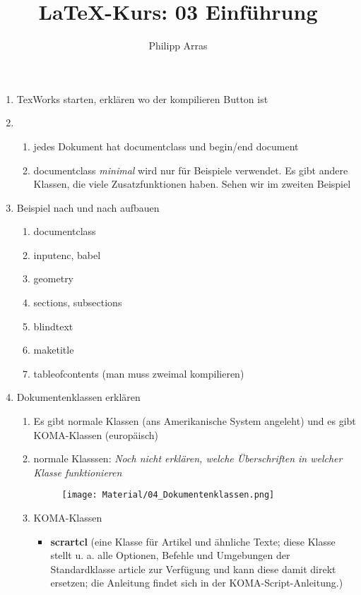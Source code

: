 \documentclass[11pt,a4paper]{article}
\author{Philipp Arras}
\title{\LaTeX -Kurs: 03 Einführung}
\begin{document}
\maketitle

\begin{enumerate}
\item TexWorks starten, erklären wo der kompilieren Button ist
\item 
	\begin{enumerate}
	\item jedes Dokument hat documentclass und begin/end document
	\item documentclass \emph{minimal} wird nur für Beispiele verwendet. Es gibt andere Klassen, die viele Zusatzfunktionen haben. Sehen wir im zweiten Beispiel
	\end{enumerate}
	
\item Beispiel nach und nach aufbauen
	
	\begin{enumerate}
	\item documentclass
	\item inputenc, babel
	\item geometry
	\item sections, subsections
	\item blindtext
	\item maketitle
	\item tableofcontents (man muss zweimal kompilieren)	
	\end{enumerate}
\item Dokumentenklassen erklären
	\begin{enumerate}
	\item Es gibt normale Klassen (ans Amerikanische System angeleht) und es gibt KOMA-Klassen (europäisch)
	\item normale Klasssen: \emph{Noch nicht erklären, welche Überschriften in welcher Klasse funktionieren} 
		\begin{figure}
		\centering
		\texttt{[image: Material/04\_Dokumentenklassen.png]}
		\end{figure}
	\item KOMA-Klassen
		\begin{itemize}
		\item \textbf{scrartcl}  (eine Klasse für Artikel und ähnliche Texte; diese Klasse stellt u. a. alle Optionen, Befehle und Umgebungen der Standardklasse article zur Verfügung und kann diese damit direkt ersetzen; die Anleitung findet sich in der KOMA-Script-Anleitung.)

\end{itemize}
\end{enumerate}
\end{enumerate}
\end{document}
